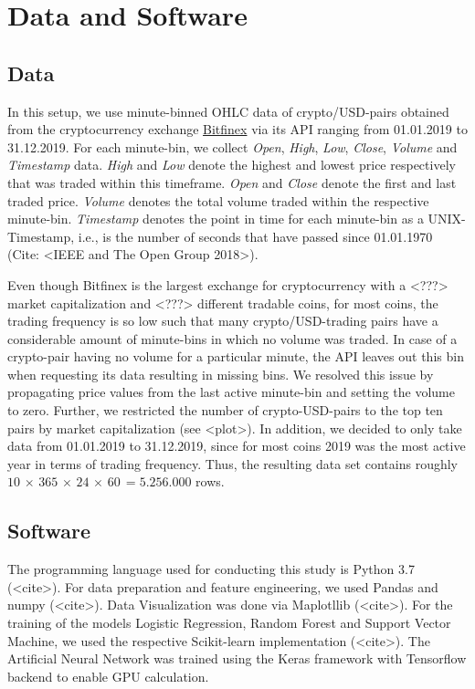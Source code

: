 \section{Data and Software}

\subsection{Data}
In this setup, we use minute-binned OHLC data of crypto/USD-pairs obtained from the cryptocurrency 
exchange \href{ https://www.bitfinex.com/ }{Bitfinex} via its API ranging from 01.01.2019 to 31.12.2019.
For each minute-bin, we collect \textit{Open}, \textit{High}, \textit{Low}, \textit{Close}, \textit{Volume} 
and \textit{Timestamp} data. 
\textit{High} and \textit{Low} denote the highest and lowest price respectively
that was traded within this timeframe. 
\textit{Open} and \textit{Close} denote the first and last traded price.
\textit{Volume} denotes the total volume traded within the respective minute-bin.
\textit{Timestamp} denotes the point in time for each minute-bin as a UNIX-Timestamp,
i.e., is the number of seconds that have passed since 01.01.1970 (Cite: <IEEE and The Open Group 2018>).

Even though Bitfinex is the largest exchange for cryptocurrency with a <???> market capitalization and
<???> different tradable coins, for most coins, the trading frequency is so low such that 
many crypto/USD-trading pairs have a considerable amount of minute-bins in which no volume was traded.
In case of a crypto-pair having no volume for a particular minute, the API leaves out this bin
when requesting its data resulting in missing bins. 
We resolved this issue by propagating price values from the last active minute-bin
and setting the volume to zero. Further, we restricted the number of crypto-USD-pairs to the
top ten pairs by market capitalization (see <plot>). 
In addition, we decided to only take data from 01.01.2019 to 31.12.2019, 
since for most coins 2019 was the most active year in terms of trading frequency.
Thus, the resulting data set contains roughly
$ 10\, \times\, 365\, \times\, 24\, \times\, 60\, = 5.256.000 $ rows.

\subsection{Software}
The programming language used for conducting this study is Python 3.7 (<cite>).
For data preparation and feature engineering, we used Pandas and numpy (<cite>).
Data Visualization was done via Maplotllib (<cite>).
For the training of the models Logistic Regression, Random Forest and Support Vector Machine,
we used the respective Scikit-learn implementation (<cite>). 
The Artificial Neural Network was trained using the Keras framework with Tensorflow backend to enable
GPU calculation.